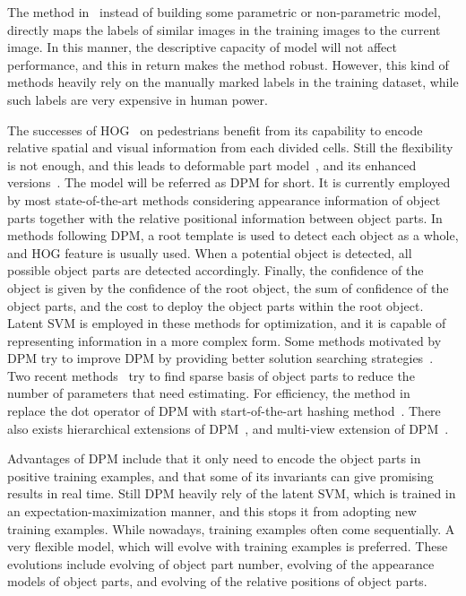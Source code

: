 \documentclass[paper]{ieice}
\begin{document}
The method in~\cite{lbt1} instead of building some parametric or non-parametric model, directly maps the labels of similar images in the training images to the current image. In this manner, the descriptive capacity of model will not affect performance, and this in return makes the method robust. However, this kind of methods heavily rely on the manually marked labels in the training dataset, while such labels are very expensive in human power.

The successes of HOG~\cite{ij4} on pedestrians benefit from its capability to encode relative spatial and visual information from each divided cells. Still the flexibility is not enough, and this leads to deformable part model~\cite{ac30,dpm1}, and its enhanced versions~\cite{ac31,dpm2}. The model will be referred as DPM for short. It is currently employed by most state-of-the-art methods considering  appearance information of object parts together with the relative positional information between object parts. In methods following DPM, a root template is used to detect each object as a whole, and HOG feature is usually used. When a potential object is detected, all possible object parts are detected accordingly. Finally, the confidence of the object is given by the confidence of the root object, the sum of confidence of the object parts, and the cost to deploy the object parts within the root object. Latent SVM is employed in these methods for optimization, and it is capable of representing information in a more complex form. Some methods motivated by DPM try to improve DPM by providing better solution searching strategies~\cite{dpm3}.  Two recent methods~\cite{spm,spltm} try to find sparse basis of object parts to reduce the number of parameters that need estimating. For efficiency, the method in~\cite{408} replace the dot operator of DPM with start-of-the-art hashing method~\cite{lsh}. There also exists hierarchical extensions of DPM~\cite{hdpm}, and multi-view extension of DPM~\cite{mvdpm}.

Advantages of DPM include that it only need to encode the object parts in positive training examples, and that  some of its invariants can give promising results in real time. Still DPM heavily rely of the latent SVM, which is trained in an  expectation-maximization manner, and this stops it from adopting new training examples. While nowadays, training examples often come sequentially. A very flexible model, which will evolve with training examples is preferred. These evolutions include evolving of object part number, evolving of the appearance models of object parts, and evolving of the relative positions of object parts.
\end{document}
